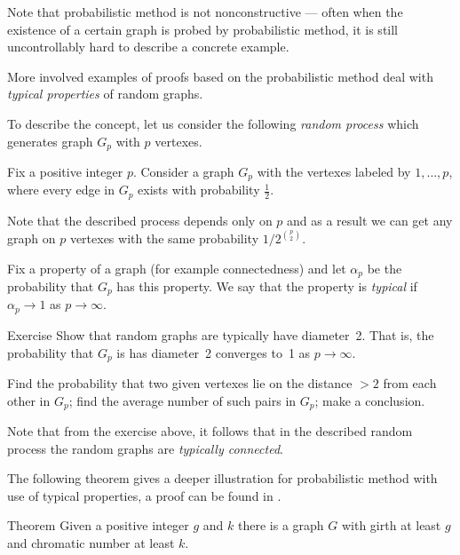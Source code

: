 Note that probabilistic method is not nonconstructive ---
often when the existence of a certain graph is probed by probabilistic method,
it is still uncontrollably hard to describe a concrete example.

More involved examples of proofs based on the probabilistic method deal with {}\emph{typical properties} of random graphs.

To describe the concept, let us consider the following {}\emph{random process} which generates graph $G_p$ with $p$ vertexes.

Fix a positive integer $p$. 
Consider a graph $G_p$ with the vertexes labeled by $1,\dots,p$,
where every edge in $G_p$ exists with probability $\tfrac12$.

Note that the described process depends only on $p$ and as a result we can get any graph on $p$ vertexes with the same probability $1/2^{\binom{p}{2}}$.

Fix a property of a graph (for example connectedness)
and let $\alpha_p$ be the probability that $G_p$ has this property.
We say that the property is \emph{typical} if $\alpha_p\to 1$ as $p\to \infty$.

\begin{thm}{Exercise}
Show that random graphs are typically have diameter~2.
That is, the probability that $G_p$ is has diameter~2 converges to~1 as $p\to \infty$.
\end{thm}

 Find the probability that two given vertexes lie on the distance $>2$ from each other in $G_p$; find the average number of such pairs in $G_p$; make a conclusion.

\medskip

Note that from the exercise above, it follows that in the described random process the random graphs are {}\emph{typically connected}.

The following theorem gives a deeper illustration for probabilistic method with use of typical properties,
a proof can be found in \cite[Chapter 44]{aigner-ziegler}.

\begin{thm}{Theorem}
Given a positive integer $g$ and $k$ there is a graph $G$ with girth at least $g$ and chromatic number at least $k$.
\end{thm}
